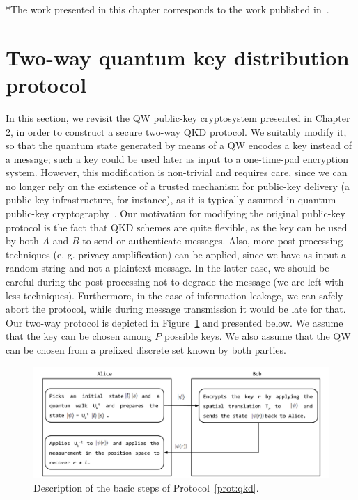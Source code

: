 \vfill

\begin{center}
 *The work presented in this chapter corresponds to the work published in~\cite{vla:kra:mat:pau:sou:17}.
\end{center}

\newpage



\section{Two-way quantum key distribution protocol}
\label{sec:qkdscheme}
In this section, we revisit the QW public-key cryptosystem presented in Chapter 2, in order to construct a secure two-way QKD protocol. We suitably modify it, so that the quantum state generated by means of a QW encodes a key instead of a message; such a key could be used later as input to a one-time-pad encryption system. However, this modification is non-trivial and requires care, since we can no longer rely on the existence of a trusted mechanism for public-key delivery (a public-key infrastructure, for instance), as it is typically assumed in quantum public-key cryptography~\cite{nik:08,sey:nik:alb:12}. 
Our motivation for modifying the original public-key protocol is the fact that QKD schemes are quite flexible, as the key can be used by both $A$ and $B$ to send or authenticate messages. Also, more post-processing techniques (e. g. privacy amplification) can be applied, since we have as input a random string and not a plaintext message. In the latter case, we should be careful during the post-processing not to degrade the message (we are left with less techniques). Furthermore, in the case of information leakage, we can safely abort the protocol, while during message transmission it would be late for that.
Our two-way protocol is depicted in Figure~\ref{fig:protQKD} and presented below. We assume that the key can be chosen among $P$ possible keys. We also assume that the QW can be chosen from a prefixed discrete set known by both parties. 



\begin{center}
\begin{figure}[!h]
  \centering
  \includegraphics[width=\textwidth]{protocol_QKD.png}
\caption{Description of the basic steps of Protocol~\ref{prot:qkd}.                                     }
\label{fig:protQKD}
\end{figure}
\end{center}



